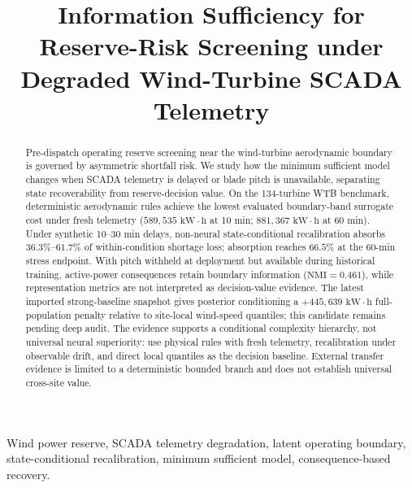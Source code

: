 \documentclass[
  journal]{IEEEtran}
\author{}
\date{}
\begin{document}
\title{Information Sufficiency for Reserve-Risk Screening under Degraded Wind-Turbine SCADA Telemetry}

\author{%
}

\maketitle

\begin{abstract}
Pre-dispatch operating reserve screening near the wind-turbine aerodynamic boundary is governed by asymmetric shortfall risk. We study how the minimum sufficient model changes when SCADA telemetry is delayed or blade pitch is unavailable, separating state recoverability from reserve-decision value. On the 134-turbine WTB benchmark, deterministic aerodynamic rules achieve the lowest evaluated boundary-band surrogate cost under fresh telemetry ($589{,}535\text{ kW}\cdot\text{h}$ at 10 min; $881{,}367\text{ kW}\cdot\text{h}$ at 60 min). Under synthetic 10--30 min delays, non-neural state-conditional recalibration absorbs $36.3\%$--$61.7\%$ of within-condition shortage loss; absorption reaches $66.5\%$ at the 60-min stress endpoint. With pitch withheld at deployment but available during historical training, active-power consequences retain boundary information ($\text{NMI}=0.461$), while representation metrics are not interpreted as decision-value evidence. The latest imported strong-baseline snapshot gives posterior conditioning a $+445{,}639\text{ kW}\cdot\text{h}$ full-population penalty relative to site-local wind-speed quantiles; this candidate remains pending deep audit. The evidence supports a conditional complexity hierarchy, not universal neural superiority: use physical rules with fresh telemetry, recalibration under observable drift, and direct local quantiles as the decision baseline. External transfer evidence is limited to a deterministic bounded branch and does not establish universal cross-site value.
\end{abstract}

\begin{IEEEkeywords}
Wind power reserve, SCADA telemetry degradation, latent operating boundary, state-conditional recalibration, minimum sufficient model, consequence-based recovery.
\end{IEEEkeywords}
\end{document}
